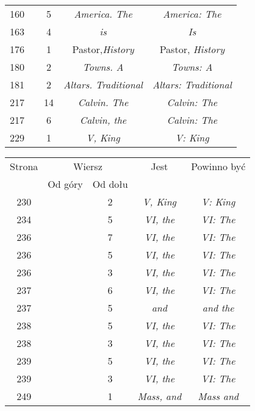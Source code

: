 \documentclass[a4paper,11pt]{article}
\numberwithin{equation}{section}
\begin{document}
\begin{center}
\begin{tabular}{|c|c|c|c|c|}
    160 & & \hphantom{0}5 & \textit{America. The} & \textit{America: The} \\
    163 & & \hphantom{0}4 & \textit{is} & \textit{Is} \\
    176 & & \hphantom{0}1 & Pastor,\textit{History}
    & Pastor, \textit{History} \\
    180 & & \hphantom{0}2 & \textit{Towns. A} & \textit{Towns: A} \\
    181 & & \hphantom{0}2 & \textit{Altars. Traditional}
           & \textit{Altars: Traditional} \\
    217 & & 14 & \textit{Calvin. The} & \textit{Calvin: The} \\
    217 & & \hphantom{0}6 & \textit{Calvin, the} & \textit{Calvin: The} \\
    229 & & \hphantom{0}1 & \textit{V, King} & \textit{V: King} \\
    \hline
  \end{tabular}





  \newpage

  \begin{tabular}{|c|c|c|c|c|}
    \hline
    Strona & \multicolumn{2}{c|}{Wiersz} & Jest
                              & Powinno być \\ \cline{2-3}
    & Od góry & Od dołu & & \\
    \hline
    230 & & \hphantom{0}2 & \textit{V, King} & \textit{V: King} \\
    234 & & \hphantom{0}5 & \textit{VI, the} & \textit{VI: The} \\
    236 & & \hphantom{0}7 & \textit{VI, the} & \textit{VI: The} \\
    236 & & \hphantom{0}5 & \textit{VI, the} & \textit{VI: The} \\
    236 & & \hphantom{0}3 & \textit{VI, the} & \textit{VI: The} \\
    237 & & \hphantom{0}6 & \textit{VI, the} & \textit{VI: The} \\
    237 & & \hphantom{0}5 & \textit{and} & \textit{and the} \\
    238 & & \hphantom{0}5 & \textit{VI, the} & \textit{VI: The} \\
    238 & & \hphantom{0}3 & \textit{VI, the} & \textit{VI: The} \\
    239 & & \hphantom{0}5 & \textit{VI, the} & \textit{VI: The} \\
    239 & & \hphantom{0}3 & \textit{VI, the} & \textit{VI: The} \\
    249 & & \hphantom{0}1 & \textit{Mass, and} & \textit{Mass and} \\
    \hline
  \end{tabular}






\end{center}
\end{document}
